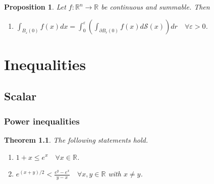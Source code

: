 \documentclass[11pt,a4paper]{report}
\newtheorem{theorem}{Theorem}[section]
\newtheorem{proposition}[theorem]{Proposition}
\theoremstyle{definition}
\begin{document}
\begin{proposition}

	Let $f: \mathbb{R}^{n} \rightarrow \mathbb{R}$ be continuous and summable. 
	Then
	\begin{enumerate}[label=(\alph*)]
	\rm\item $\displaystyle \int_{B_{\varepsilon}(0)} f(x) dx = \int_{0}^{\varepsilon} \left( \int_{\partial B_r(0)} f(x) d\mathcal{S}(x) \right) dr \quad \forall \varepsilon>0$.
	\end{enumerate}
	\end{proposition}

\chapter{Inequalities} 

\section{Scalar}

\subsection{Power inequalities}

\begin{theorem}
	The following statements hold.
	\begin{enumerate}[label=(\alph*)] 
		\rm\item $1 + x \leq e^{x} \quad \forall x \in \mathbb{R}$.
		\rm\item $\displaystyle e^{(x + y)/2} < \frac{e^{y} - e^{x}}{y - x} \quad \forall x, y \in \mathbb{R}$ with $x \neq y$.
	\end{enumerate}
\end{theorem}
\end{document}
